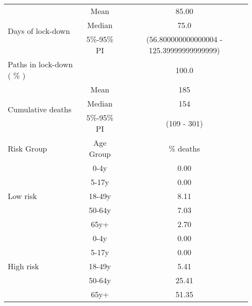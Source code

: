\documentclass{article}
\begin{document}
\begin{table}[th]
\centering
\begin{tabular}{p{4cm}cc}
\toprule
\multirow{3}{*}{Days   of lock-down} & Mean      & 85.00                        \\ \cmidrule(l){2-3} 
                                     & Median    & 75.0                      \\ \cmidrule(l){2-3} 
                                     & 5\%-95\% PI & (56.800000000000004 - 125.39999999999999)       \\ \midrule 
\multirow{1}{*}{Paths in lock-down ( \% )} &      &         100.0              \\   \midrule                     
\multirow{3}{\hsize}{Cumulative deaths}       & Mean      & 185 \\ \cmidrule(l){2-3} 
                                     & Median    & 154                        \\ \cmidrule(l){2-3} 
                                     & 5\%-95\% PI & (109 - 301)           \\  \midrule
Risk Group                           & Age Group & \multicolumn{1}{c}{\% deaths}        \\  \midrule
\multirow{5}{*}{Low   risk}          & 0-4y      & 0.00                         \\ \cmidrule(l){2-3} 
                                     & 5-17y     & 0.00                         \\ \cmidrule(l){2-3} 
                                     & 18-49y    & 8.11                         \\ \cmidrule(l){2-3} 
                                     & 50-64y    & 7.03                         \\ \cmidrule(l){2-3} 
                                     & 65y+      & 2.70                         \\ \midrule
\multirow{5}{*}{High   risk}         & 0-4y      & 0.00                         \\ \cmidrule(l){2-3} 
                                     & 5-17y     & 0.00                         \\ \cmidrule(l){2-3} 
                                     & 18-49y    & 5.41                         \\ \cmidrule(l){2-3} 
                                     & 50-64y    & 25.41                         \\ \cmidrule(l){2-3} 
                                     & 65y+      & 51.35                         \\ \midrule

\end{tabular}
\end{table}
\end{document}
